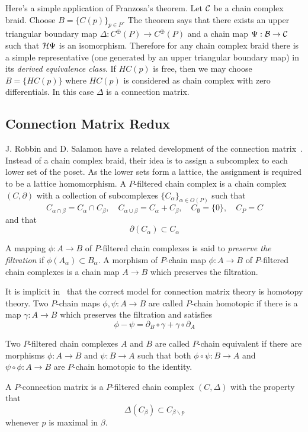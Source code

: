 Here's a simple application of Franzosa's theorem.  Let ${\mathcal C}$ be a chain complex braid.  Choose $B = \{C(p)\}_{p\in P}$.  The theorem says that there exists an upper triangular boundary map $\Delta:C^\oplus(P)\to C^\oplus(P)$ and a chain map $\Psi:{\mathcal B}\to {\mathcal C}$ such that ${\mathcal H}\Psi$ is an isomorphism.  Therefore for any chain complex braid there is a simple representative (one generated by an upper triangular boundary map) in its {\em derived equivalence class}.  If $HC(p)$ is free, then we may choose $B=\{HC(p)\}$ where $HC(p)$ is considered as chain complex with zero differentials.  In this case $\Delta$ is a connection matrix.


\subsection{Connection Matrix Redux}



J. Robbin and D. Salamon have a related development of the connection matrix~\cite{salamon}.   Instead of a chain complex braid, their idea is to assign a subcomplex to each lower set of the poset.  As the lower sets form a lattice, the assignment is required to be a lattice homomorphism.  A $P$-filtered chain complex is a chain complex $(C,\partial)$ with a collection of subcomplexes $\{C_\alpha\}_{\alpha\in O(P)}$ such that $$C_{\alpha\cap \beta} = C_\alpha\cap C_\beta, \quad C_{\alpha\cup \beta} = C_\alpha + C_\beta,\quad C_\emptyset = \{0\},\quad C_P = C$$ and that $$\partial(C_\alpha)\subset C_\alpha$$

A mapping $\phi:A\to B$ of $P$-filtered chain complexes is said to {\em preserve the filtration} if $\phi(A_\alpha)\subset B_\alpha$.  A morphism of $P$-chain map $\phi:A\to B$ of $P$-filtered chain complexes is a chain map $A\to B$ which preserves the filtration.

It is implicit in~\cite{salamon} that the correct model for connection matrix theory is homotopy theory.    Two $P$-chain maps $\phi,\psi:A\to B$ are called $P$-chain homotopic if there is a map $\gamma:A\to B$ which preserves the filtration and satisfies $$\phi-\psi = \partial_B \circ \gamma + \gamma\circ \partial_A$$

Two $P$-filtered chain complexes $A$ and $B$ are called $P$-chain equivalent if there are morphisms $\phi:A\to B$ and $\psi:B\to A$ such that both $\phi\circ \psi:B\to A$ and $\psi\circ \phi:A\to B$ are $P$-chain homotopic to the identity.

A $P$-connection matrix is a $P$-filtered chain complex $(C,\Delta)$ with the property that $$\Delta(C_\beta)\subset C_{\beta \backslash p}$$ whenever $p$ is maximal in $\beta$.  



